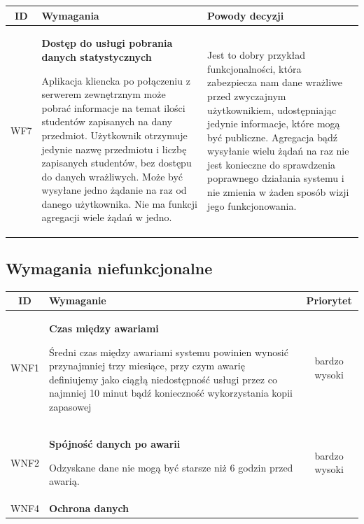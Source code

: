 {\begin{tabularx}{\textwidth}{|c|X|X|}
\end{tabularx}
\newpage
\begin{tabularx}{\textwidth}{|c|X|X|}
\hline
\textbf{ID} & \textbf{Wymagania}  & \textbf{Powody decyzji} \\
\hline

\label{z:WF7} WF7 & \textbf{Dostęp do usługi pobrania danych statystycznych} 
 
Aplikacja kliencka po połączeniu z serwerem zewnętrznym może pobrać informacje na temat ilości studentów zapisanych na dany przedmiot. Użytkownik otrzymuje jedynie nazwę przedmiotu i liczbę zapisanych studentów, bez dostępu do danych wrażliwych. Może być wysyłane jedno żądanie na raz od danego użytkownika. Nie ma funkcji agregacji wiele żądań w jedno. & 
Jest to dobry przykład funkcjonalności, która zabezpiecza nam dane wrażliwe przed zwyczajnym użytkownikiem, udostępniając jedynie informacje, które mogą być publiczne. Agregacja bądź wysyłanie wielu żądań na raz nie jest konieczne do sprawdzenia poprawnego działania systemu i nie zmienia w żaden sposób wizji jego funkcjonowania.\\
\hline



\end{tabularx}

\subsection[Wymagania niefunkcjonalne]{Wymagania niefunkcjonalne}


\begin{tabularx}{\textwidth}{|c|X|c|}
\hline
\textbf{ID} & \textbf{Wymaganie}  & \textbf{Priorytet} \\
\hline

\label{z:WNF1} WNF1 & \textbf{Czas między awariami} 
 
Średni czas między awariami systemu powinien wynosić przynajmniej trzy miesiące, przy czym awarię definiujemy jako ciągłą niedostępność usługi przez co najmniej 10 minut bądź konieczność wykorzystania kopii zapasowej
 & bardzo wysoki\\
\hline

\label{z:WNF2} WNF2 & \textbf{Spójność danych po awarii} 
 
Odzyskane dane nie mogą być starsze niż 6 godzin przed awarią.
 & bardzo wysoki\\
\hline

\label{z:WNF4} WNF4 & \textbf{Ochrona danych} 
 

\end{tabularx}}
